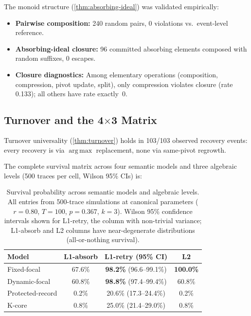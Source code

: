 \documentclass[11pt]{article}
\theoremstyle{plain}
\theoremstyle{definition}
\theoremstyle{remark}
\DeclareMathOperator*{\argmax}{arg\,max}
\begin{document}
The monoid structure (\cref{thm:absorbing-ideal}) was validated
empirically:
\begin{itemize}[nosep]
  \item \textbf{Pairwise composition:} 240 random pairs, 0 violations
    vs.\ event-level reference.
  \item \textbf{Absorbing-ideal closure:} 96 committed absorbing
    elements composed with random suffixes, 0 escapes.
  \item \textbf{Closure diagnostics:} Among elementary operations
    (composition, compression, pivot update, split), only compression
    violates closure (rate 0.133); all others have rate exactly~0.
\end{itemize}

\subsection{Turnover and the 4$\times$3 Matrix}

Turnover universality (\cref{thm:turnover}) holds in 103/103 observed
recovery events: every recovery is via $\argmax$ replacement, none via
same-pivot regrowth.

The complete survival matrix across four semantic models and three
algebraic levels (500 traces per cell, Wilson 95\% CIs) is:

\begin{table}[H]
\centering
\caption{Survival probability across semantic models and algebraic
  levels.  All entries from 500-trace simulations at canonical
  parameters ($r = 0.80$, $T = 100$, $p = 0.367$, $k = 3$).  Wilson
  95\% confidence intervals shown for L1-retry, the column with
  non-trivial variance; L1-absorb and L2 columns have near-degenerate
  distributions (all-or-nothing survival).}
\label{tab:4x3}
\begin{tabular}{@{}lccc@{}}
\toprule
\textbf{Model} & \textbf{L1-absorb} & \textbf{L1-retry (95\% CI)}
  & \textbf{L2} \\
\midrule
Fixed-focal      & 67.6\% & \textbf{98.2\%} (96.6--99.1\%) & \textbf{100.0\%} \\
Dynamic-focal    & 60.8\% & \textbf{98.8\%} (97.4--99.4\%) & 60.8\% \\
Protected-record & 0.2\%  & 20.6\% (17.3--24.4\%)          & 0.2\% \\
K-core           & 0.8\%  & 25.0\% (21.4--29.0\%)          & 0.8\% \\
\bottomrule
\end{tabular}
\end{table}
\end{document}
